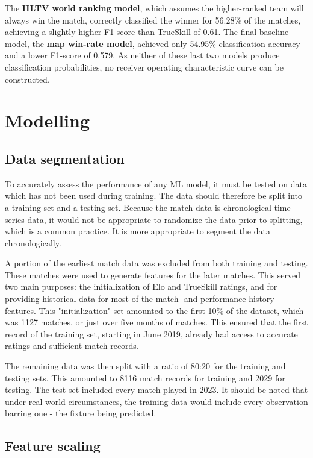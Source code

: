 The \textbf{HLTV world ranking model}, which assumes the higher-ranked team will always win the match, correctly classified the winner for 56.28\% of the matches, achieving a slightly higher F1-score than TrueSkill of 0.61. The final baseline model, the \textbf{map win-rate model}, achieved only 54.95\% classification accuracy and a lower F1-score of 0.579. As neither of these last two models produce classification probabilities, no receiver operating characteristic curve can be constructed.

\section{Modelling}

\subsection{Data segmentation}

To accurately assess the performance of any ML model, it must be tested on data which has not been used during training. The data should therefore be split into a training set and a testing set. Because the match data is chronological time-series data, it would not be appropriate to randomize the data prior to splitting, which is a common practice. It is more appropriate to segment the data chronologically.

A portion of the earliest match data was excluded from both training and testing. These matches were used to generate features for the later matches. This served two main purposes: the initialization of Elo and TrueSkill ratings, and for providing historical data for most of the match- and performance-history features. This "initialization" set amounted to the first 10\% of the dataset, which was 1127 matches, or just over five months of matches. This ensured that the first record of the training set, starting in June 2019, already had access to accurate ratings and sufficient match records.

The remaining data was then split with a ratio of 80:20 for the training and testing sets. This amounted to 8116 match records for training and 2029 for testing. The test set included every match played in 2023. It should be noted that under real-world circumstances, the training data would include every observation barring one - the fixture being predicted.

\subsection{Feature scaling}

